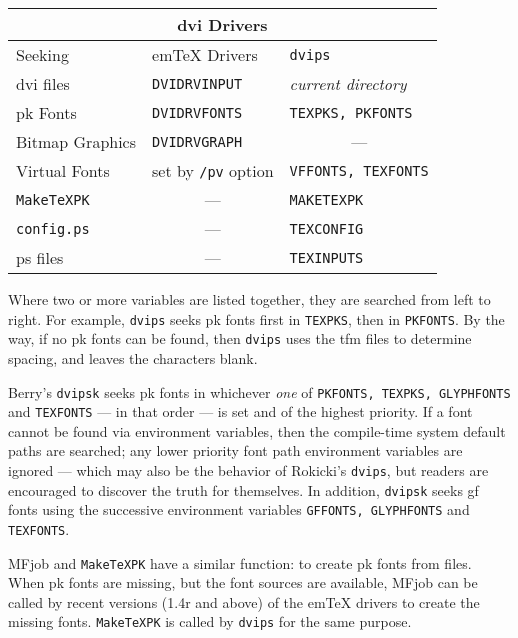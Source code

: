 \begin{center}
\begin{tabular}{|l|l|l|}
  \hline
  \multicolumn{3}{|c|}{{\sc dvi} Drivers} \\
  \hline
  Seeking & em\TeX{} Drivers & {\tt dvips} \\
  \hline
  {\sc dvi} files & {\tt DVIDRVINPUT} & {\em current directory} \\
  {\sc pk} Fonts & {\tt DVIDRVFONTS} & {\tt TEXPKS, PKFONTS} \\
  Bitmap Graphics & {\tt DVIDRVGRAPH} & \multicolumn{1}{c|}{---} \\
  Virtual Fonts & set by {\tt /pv} option & {\tt VFFONTS, TEXFONTS} \\
  {\tt MakeTeXPK} & \multicolumn{1}{c|}{---} & {\tt MAKETEXPK} \\
  {\tt config.ps} & \multicolumn{1}{c|}{---} & {\tt TEXCONFIG} \\
  {\sc ps} files & \multicolumn{1}{c|}{---} & {\tt TEXINPUTS} \\
  \hline
\end{tabular}
\end{center}

Where two or more variables are listed together, they are
searched from left to right.  For example, {\tt dvips} seeks {\sc pk}
fonts first in {\tt TEXPKS}, then in {\tt PKFONTS}.
By the way, if no {\sc pk} fonts can be found, then {\tt dvips}
uses the {\sc tfm} files to determine spacing, and leaves the
characters blank.

{\sc Berry}'s {\tt dvipsk} seeks {\sc pk} fonts in whichever
{\em one\/} of {\tt PKFONTS, TEXPKS, GLYPHFONTS} and {\tt TEXFONTS}
--- in that order --- is set and of the highest priority.
If a font cannot be found via environment variables, then the
compile-time system default paths are searched; any lower priority
font path environment variables are ignored --- which may also be the
behavior of Rokicki's {\tt dvips}, but readers are encouraged to
discover the truth for themselves.
In addition, {\tt dvipsk} seeks {\sc gf} fonts using the successive
environment variables {\tt GFFONTS, GLYPHFONTS} and {\tt TEXFONTS}.

{\sf MFjob} and {\tt MakeTeXPK} have a similar function:
to create {\sc pk} fonts from \MF{} files.
When {\sc pk} fonts are missing, but the \MF{} font sources
are available,
{\sf MFjob} can be called by recent versions (1.4r and above)
of the em\TeX{} drivers to create the missing fonts.
{\tt MakeTeXPK} is called by {\tt dvips} for the same purpose.

